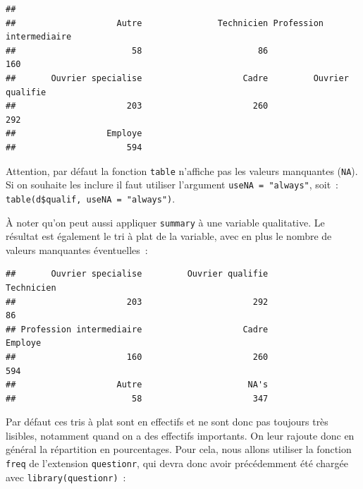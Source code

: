 \documentclass[12pt,]{book}
\makeatletter
\newenvironment{Shaded}{\begin{snugshade}}{\end{snugshade}}
\newcommand{\KeywordTok}[1]{\textcolor[rgb]{0.13,0.29,0.53}{\textbf{#1}}}
\newcommand{\NormalTok}[1]{#1}
\newcommand{\OperatorTok}[1]{\textcolor[rgb]{0.81,0.36,0.00}{\textbf{#1}}}
\newcommand{\StringTok}[1]{\textcolor[rgb]{0.31,0.60,0.02}{#1}}
\newenvironment{kframe}{%
\medskip{}
\setlength{\fboxsep}{.8em}
\def\at@end@of@kframe{}%
\ifinner\ifhmode%
 \def\at@end@of@kframe{\end{minipage}}%
 \begin{minipage}{\columnwidth}%
\fi\fi%
\def\FrameCommand##1{\hskip\@totalleftmargin \hskip-\fboxsep
\colorbox{incolor}{##1}\hskip-\fboxsep
    \hskip-\linewidth \hskip-\@totalleftmargin \hskip\columnwidth}%
\MakeFramed {\advance\hsize-\width
  \@totalleftmargin\z@ \linewidth\hsize
  \@setminipage}}%
{\par\unskip\endMakeFramed%
\at@end@of@kframe}
\newenvironment{rmdblock}[1]
 {
 \begin{itemize}
 \renewcommand{\labelitemi}{
   \raisebox{-.7\height}[0pt][0pt]{
     {\setkeys{Gin}{width=3em,keepaspectratio}\texttt{[image: images/\#1]}}
   }
 }
 \begin{kframe}
 \setlength{\fboxsep}{1em}
 \item
 }
 {
 \end{kframe}
 \end{itemize}
 }
\newenvironment{rmdimportant}
  {\begin{rmdblock}{important}}
  {\end{rmdblock}}
\makeatother
\begin{document}
\begin{Shaded}
\end{Shaded}

\begin{verbatim}
## 
##                    Autre               Technicien Profession intermediaire 
##                       58                       86                      160 
##       Ouvrier specialise                    Cadre         Ouvrier qualifie 
##                      203                      260                      292 
##                  Employe 
##                      594
\end{verbatim}

\begin{rmdimportant}
Attention, par défaut la fonction \texttt{table} n'affiche pas les valeurs manquantes (\texttt{NA}). Si on souhaite les inclure il faut utiliser l'argument \texttt{useNA\ =\ "always"}, soit~: \texttt{table(d\$qualif,\ useNA\ =\ "always")}.
\end{rmdimportant}

À noter qu'on peut aussi appliquer \texttt{summary} à une variable qualitative. Le résultat est également le tri à plat de la variable, avec en plus le nombre de valeurs manquantes éventuelles~:

\begin{Shaded}
\end{Shaded}

\begin{verbatim}
##       Ouvrier specialise         Ouvrier qualifie               Technicien 
##                      203                      292                       86 
## Profession intermediaire                    Cadre                  Employe 
##                      160                      260                      594 
##                    Autre                     NA's 
##                       58                      347
\end{verbatim}

Par défaut ces tris à plat sont en effectifs et ne sont donc pas toujours très lisibles, notamment quand on a des effectifs importants. On leur rajoute donc en général la répartition en pourcentages. Pour cela, nous allons utiliser la fonction \texttt{freq} de l'extension \texttt{questionr}, qui devra donc avoir précédemment été chargée avec \texttt{library(questionr)}~:
\end{document}
